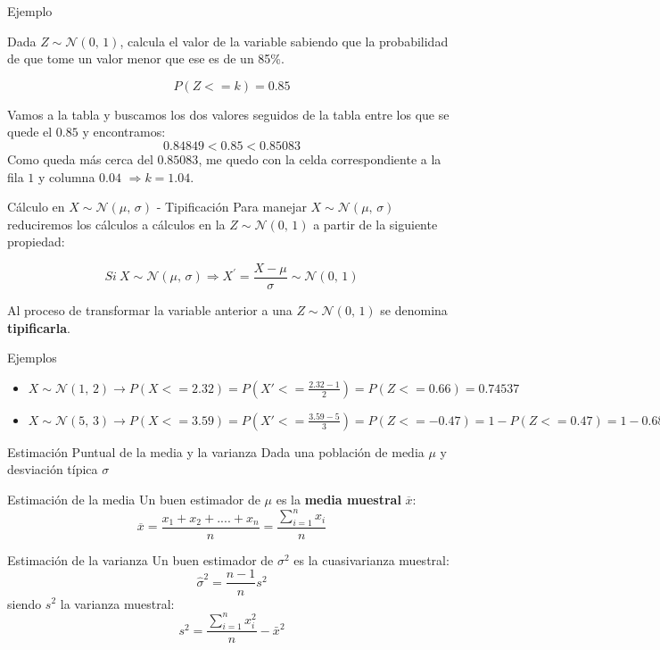 \documentclass[11pt,handout]{beamer}
\begin{document}
\begin{frame}{Ejemplo}

Dada $Z \sim \mathcal{N}(0,\,1)$, calcula el valor de la variable sabiendo que la probabilidad de que tome un valor menor que ese es de un 85\%. 

$$P(Z<=k)=0.85$$
    \begin{center}
        
    \end{center}

Vamos a la tabla y buscamos los dos valores seguidos de la tabla entre los que se quede el $0.85$ y encontramos:
$$0.84849 < 0.85 < 0.85083 $$
Como queda más cerca del $0.85083$, me quedo con la celda correspondiente a la fila $1$ y columna $0.04$  $\Rightarrow k=1.04$.
\end{frame}

\begin{frame}{Cálculo en $X \sim \mathcal{N}(\mu,\,\sigma)$ - Tipificación}
Para manejar $X \sim \mathcal{N}(\mu,\,\sigma)$ reduciremos los cálculos a cálculos en la $Z \sim \mathcal{N}(0,\,1)$ a partir de la siguiente propiedad:

\begin{block}{}
$$ Si \  X \sim \mathcal{N}(\mu,\,\sigma) \Rightarrow X^{'}=\frac{X - \mu}{\sigma} \sim \mathcal{N}(0,\,1) $$
\end{block}

\pause

Al proceso de transformar la variable anterior a una $Z\sim \mathcal{N}(0,\,1)$ se denomina \textbf{tipificarla}.


\end{frame}



\begin{frame}{Ejemplos}

\begin{itemize}[<+->]
    \item $X \sim \mathcal{N}(1,\,2) \to P(X<=2.32)=P(X'<=\frac{2.32-1}{2})=P(Z<=0.66)=0.74537$
    \item $X \sim \mathcal{N}(5,\,3) \to P(X<=3.59)=P(X'<=\frac{3.59-5}{3})=P(Z<=-0.47)=1-P(Z<=0.47)=1-0.68082=0.31918$
\end{itemize}
\end{frame}


\begin{frame}{Estimación Puntual de la media y la varianza}
Dada una población de media $\mu$ y desviación típica $\sigma$
\begin{block}{Estimación de la media}
 Un buen estimador de $\mu$ es la \textbf{media muestral} $\overline{x}$:
$$\overline{x}= \frac{x_1 + x_2 + ....+x_n} {n}=\frac{{\sum_{i=1}^n x_i }}{n}$$
\end{block}
\pause
\begin{block}{Estimación de la varianza}
Un buen estimador de $\sigma^2$ es la cuasivarianza muestral:
$$\widehat{\sigma}^2=\frac{n-1}{n}s^2$$
siendo $s^2$ la varianza muestral:
$$s^2=\frac{\sum_{i=1}^n x_i^2 }{n} - \bar x^2$$
\end{block}
\end{frame}
\end{document}
